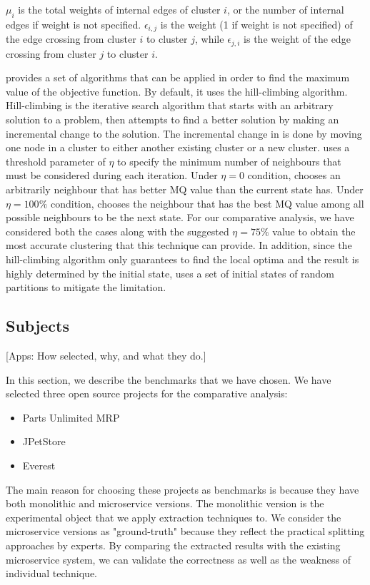 $\mu_i$ is the total weights of internal edges of cluster $i$, or the number of internal edges if weight is not specified. $\epsilon_{i,j}$ is the weight (1 if weight is not specified) of the edge crossing from cluster $i$ to cluster $j$, while $\epsilon_{j,i}$ is the weight of the edge crossing from cluster $j$ to cluster $i$.

\bn provides a set of algorithms that can be applied in order to find the maximum value of the objective function. By default, it uses the hill-climbing algorithm. Hill-climbing is the iterative search algorithm that starts with an arbitrary solution to a problem, then attempts to find a better solution by making an incremental change to the solution. The incremental change in \bn is done by moving one node in a cluster to either another existing cluster or a new cluster. \bn uses a threshold parameter of $\eta$ to specify the minimum number of neighbours that must be considered during each iteration. Under $\eta = 0$ condition, \bn chooses an arbitrarily neighbour that has better MQ value than the current state has. Under $\eta = 100\%$ condition, \bn chooses the neighbour that has the best MQ value among all possible neighbours to be the next state. For our comparative analysis, we have considered both the cases along with the suggested $\eta = 75\%$ value to obtain the most accurate clustering that this technique can provide. In addition, since the hill-climbing algorithm only guarantees to find the local optima and the result is highly determined by the initial state, \bn uses a set of initial states of random partitions to mitigate the limitation.


\subsection{Subjects}

[Apps: How selected, why, and what they do.]

In this section, we describe the benchmarks that we have chosen.
We have selected three open source projects for the comparative analysis:
\begin{itemize}
    \item Parts Unlimited MRP
    \item JPetStore
    \item Everest
\end{itemize}
The main reason for choosing these projects as benchmarks is because they have both monolithic and microservice versions. The monolithic version is the experimental object that we apply extraction techniques to. We consider the microservice versions as "ground-truth" because they reflect the practical splitting approaches by experts. By comparing the extracted results with the existing microservice system, we can validate the correctness as well as the weakness of individual technique.

